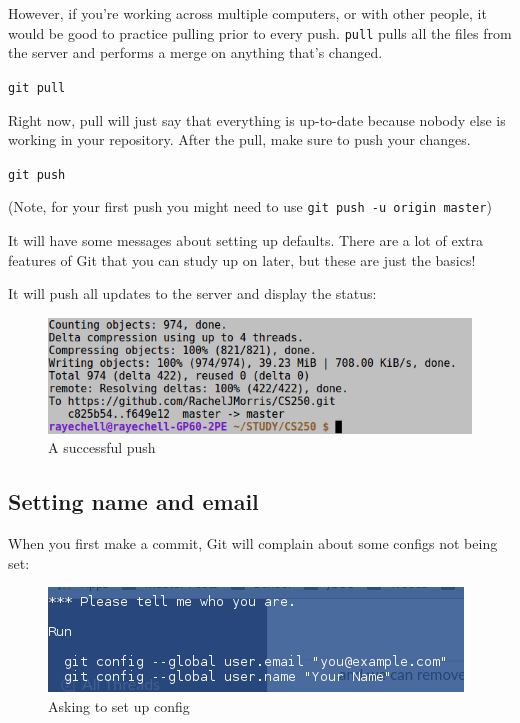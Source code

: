 \documentclass[a4paper,12pt,oneside]{book}
\begin{document}
        However, if you're working across multiple computers, or with other people,
        it would be good to practice pulling prior to every push.
        \texttt{pull} pulls all the files from the server and performs
        a merge on anything that's changed.

        \begin{center}
            \texttt{git pull}
        \end{center}

        Right now, pull will just say that everything is up-to-date
        because nobody else is working in your repository. After the
        pull, make sure to push your changes.

        \begin{center}
            \texttt{git push}
        \end{center}

        (Note, for your first push you might need to use \texttt{git push -u origin master})

        It will have some messages about setting up defaults. There are
        a lot of extra features of Git that you can study up on later,
        but these are just the basics!

        It will push all updates to the server and display the status:
        
        \begin{figure}[h]
            \centering
            \includegraphics[width=14cm]{images/git-pushed.png}
            \caption{A successful push}
        \end{figure}

    \newpage

        \subsection{Setting name and email}

        When you first make a commit, Git will complain about some configs not being set:

        \begin{figure}[h]
            \centering
            \includegraphics{images/git-config.png}
            \caption{Asking to set up config}
        \end{figure}
\end{document}

